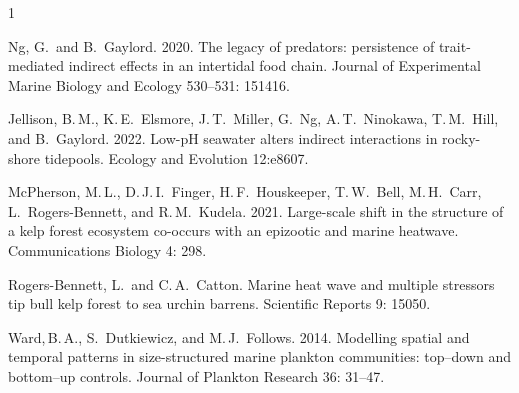 \documentclass[12pt, addpoints]{exam}
\begin{document}
\begin{hangparas}{\leftmargin}{1}



Ng, G.~and B.\ Gaylord. 2020. The legacy of predators: persistence of trait-mediated indirect effects in an intertidal food chain. Journal of Experimental Marine Biology and Ecology 530–531: 151416.

Jellison, B.\,M., K.\,E.\ Elsmore, J.\,T.\ Miller, G.\ Ng, A.\,T.\ Ninokawa, T.\,M.\ Hill, and B.\ Gaylord. 2022. Low-pH seawater alters indirect interactions in rocky-shore tidepools. Ecology and Evolution 12:e8607.

McPherson, M.\,L., D.\,J.\,I.\ Finger, H.\,F.\ Houskeeper, 
T.\,W.\ Bell, M.\,H.\ Carr, L.\ Rogers-Bennett, and R.\,M.\ Kudela. 2021.
Large-scale shift in the structure of a kelp forest ecosystem co-occurs with an epizootic and marine heatwave. Communications Biology 4: 298.

Rogers-Bennett, L.\ and C.\,A.\ Catton. Marine heat wave and multiple
stressors tip bull kelp forest to sea urchin barrens. Scientific
Reports 9: 15050. 

Ward,\,B.\,A., S.\ Dutkiewicz, and M.\,J.\ Follows. 2014. Modelling spatial and temporal patterns in size-structured marine plankton communities: top–down and bottom–up controls. Journal of Plankton
Research 36: 31–47.


\end{hangparas}
\end{document}
